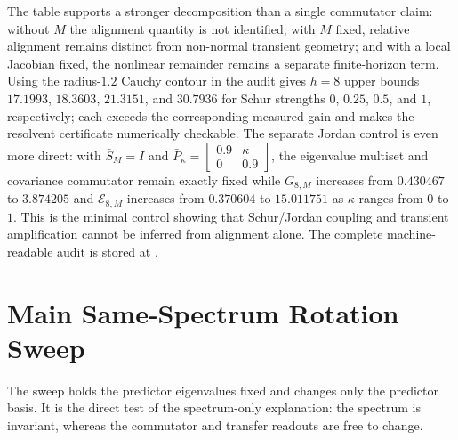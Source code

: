 \documentclass{article}
\begin{document}
The table supports a stronger decomposition than a single commutator claim:
without $M$ the alignment quantity is not identified; with $M$ fixed, relative
alignment remains distinct from non-normal transient geometry; and with a local
Jacobian fixed, the nonlinear remainder remains a separate finite-horizon term.
Using the radius-$1.2$ Cauchy contour in the audit gives $h=8$ upper bounds
$17.1993$, $18.3603$, $21.3151$, and $30.7936$ for Schur strengths
$0$, $0.25$, $0.5$, and $1$, respectively; each exceeds the corresponding
measured gain and makes the resolvent certificate numerically checkable.
The separate Jordan control is even more direct: with $\bar S_M=I$ and
$\bar P_\kappa=\left[\begin{smallmatrix}0.9&\kappa\\0&0.9\end{smallmatrix}\right]$,
the eigenvalue multiset and covariance commutator remain exactly fixed while
$G_{8,M}$ increases from $0.430467$ to $3.874205$ and
$\mathcal E_{8,M}$ increases from $0.370604$ to $15.011751$ as
$\kappa$ ranges from $0$ to $1$. This is the minimal control showing that
Schur/Jordan coupling and transient amplification cannot be inferred from
alignment alone.
The complete machine-readable audit is stored at
.

\section{Main Same-Spectrum Rotation Sweep}
\label{sec:supp-main-sweep}

The sweep holds the predictor eigenvalues fixed and changes only the predictor
basis. It is the direct test of the spectrum-only explanation: the spectrum is
invariant, whereas the commutator and transfer readouts are free to change.
\end{document}
